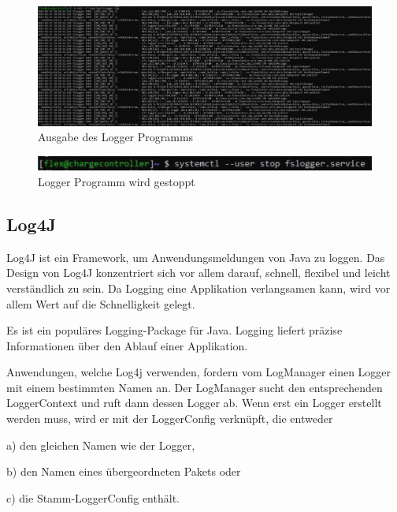 \begin{figure}[h t]
    \centering
    \includegraphics[scale=0.4]{pics/loggerLog.JPG}
    \caption{Ausgabe des Logger Programms}
    \label{fig:impl:loggerLog}
\end{figure}

\begin{figure}[h t]
    \centering
    \includegraphics[scale=0.75]{pics/loggerEnd2.JPG}
    \caption{Logger Programm wird gestoppt}
    \label{fig:impl:loggerEnd}
\end{figure}

\subsection{Log4J}
Log4J ist ein Framework, um Anwendungsmeldungen von Java zu loggen.
Das Design von Log4J konzentriert sich vor allem darauf, schnell, flexibel und leicht verständlich zu sein. Da Logging eine Applikation verlangsamen kann, wird vor allem Wert auf die Schnelligkeit gelegt. \cite{log4JBuch} 

Es ist ein populäres Logging-Package für Java. Logging liefert präzise Informationen über den Ablauf einer Applikation. \cite{log4J}


Anwendungen, welche Log4j verwenden, fordern vom LogManager einen Logger mit einem bestimmten Namen an. Der LogManager sucht den entsprechenden LoggerContext und ruft dann dessen Logger ab. 
Wenn erst ein Logger erstellt werden muss, wird er mit der LoggerConfig verknüpft, die entweder 

\begin{compactitem}
    \item[a)] den gleichen Namen wie der Logger, 
    \item[b)] den Namen eines übergeordneten Pakets oder 
    \item[c)] die Stamm-LoggerConfig enthält.
\end{compactitem}


